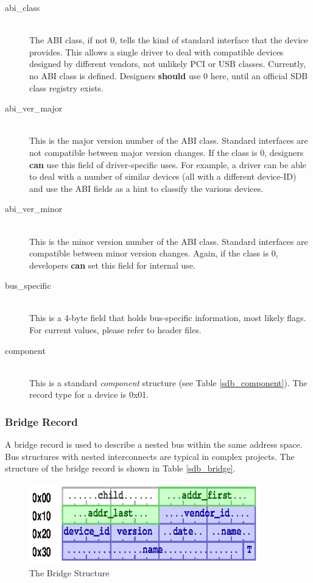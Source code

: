 \documentclass[a4paper, 12pt]{article}
\begin{document}
\begin{description}
\item[abi\_class] \hfill \\
The ABI class, if not 0, tells the kind of standard interface that the device provides. This
allows a single driver to deal with compatible devices designed by different vendors, not unlikely
PCI or USB classes.  Currently, no ABI class is defined. Designers \textbf{should} use 0 here,
until an official SDB class registry exists.

\item[abi\_ver\_major] \hfill \\
This is the major version number of the ABI class. Standard interfaces are not compatible between
major version changes.  If the class is 0, designers \textbf{can} use this field of driver-specific uses. For
example, a driver can be able to deal with a number of similar devices (all with a different device-ID)
and use the ABI fields as a hint to classify the various devices.

\item[abi\_ver\_minor] \hfill \\
This is the minor version number of the ABI class. Standard interfaces are compatible between
minor version changes. Again, if the class is 0, developers \textbf{can} set this field for internal use.

\item[bus\_specific] \hfill \\
This is a 4-byte field that holds bus-specific information, most likely flags. For current
values, please refer to header files.

\item[component] \hfill \\
This is a standard \textit{component} structure (see Table \ref{sdb_component}). The record type
for a device is 0x01.
\end{description}

\pagebreak 

\subsubsection{Bridge Record}

A bridge record is used to describe a nested bus within the same address space.  Bus
structures with nested interconnects are typical in complex projects.
The structure of the bridge record is shown in Table \ref{sdb_bridge}.

\begin{figure}[h]
\centering%
\includegraphics[width=100mm]{img/sdb-bridge.ps}
\caption{The Bridge Structure}
\label{fig:FigureBridge}
\end{figure}
\end{document}
